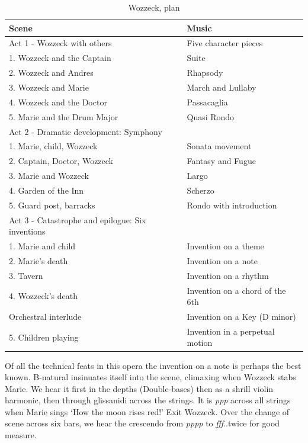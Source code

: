 \begin{table}[h!]
\begin{tabular}{|l|l|} \hline
Scene & Music \\\hline
Act 1 - Wozzeck with others & Five character pieces \\\hline
1. Wozzeck and the Captain & Suite\\
2. Wozzeck and Andres & Rhapsody\\
3. Wozzeck and Marie & March and Lullaby\\
4. Wozzeck and the Doctor & Passacaglia\\
5. Marie and the Drum Major & Quasi Rondo\\\hline
Act 2 - Dramatic development: Symphony\\\hline
1. Marie, child, Wozzeck & Sonata movement\\
2. Captain, Doctor, Wozzeck & Fantasy and Fugue\\
3. Marie and Wozzeck & Largo\\
4. Garden of the Inn & Scherzo\\
5. Guard post, barracks & Rondo with introduction\\\hline
Act 3 - Catastrophe and epilogue: Six inventions\\\hline
1. Marie and child & Invention on a theme\\
2. Marie's death & Invention on a note\\
3. Tavern & Invention on a rhythm\\
4. Wozzeck's death & Invention on a chord of the 6th\\
Orchestral interlude & Invention on a Key (D minor) \\
5. Children playing & Invention in a perpetual motion\\\hline
\end{tabular}
\caption{Wozzeck, plan}
\label{tab:wozzeckplan}
\end{table}

Of all the technical feats in this opera the invention on a note is perhaps the best known. B-natural insinuates itself into the scene, climaxing when Wozzeck stabs Marie. We hear it first in the depths (Double-bases) then as a shrill violin harmonic, then through glissanidi across the strings. It is \textit{ppp} across all strings when Marie sings `How the moon rises red!' Exit Wozzeck. Over the change of scene across six bars, we hear the crescendo from \textit{pppp} to \textit{fff}..twice for good measure. 


